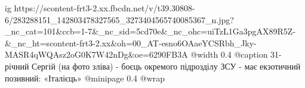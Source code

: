  
 
 
 
 

\ifcmt
  ig https://scontent-frt3-2.xx.fbcdn.net/v/t39.30808-6/283288151_142803478327565_3273404565740085367_n.jpg?_nc_cat=101&ccb=1-7&_nc_sid=5cd70e&_nc_ohc=uiTzL1Ga3pgAX89R5Z-&_nc_ht=scontent-frt3-2.xx&oh=00_AT-esno6OAaeYCSRbh_Jky-MASR4qWQAsz2oG0K7W42nDg&oe=6290FB3A
  @width 0.4
  @caption 31-річний Сергій (на фото зліва) - боєць окремого підрозділу ЗСУ - має екзотичний позивний: «Італієць»
  @minipage 0.4
  @wrap \parpic[r]
\fi
